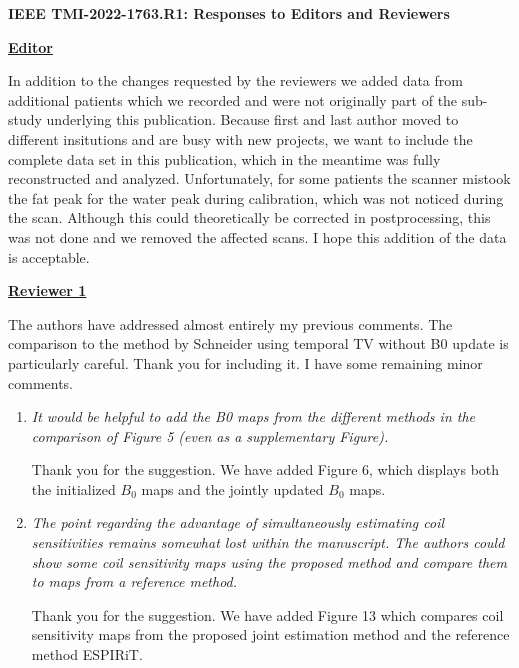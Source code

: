 \documentclass[a4paper,11pt]{report}
\begin{document}
	
\begin{center}
	{\large\textbf{IEEE TMI-2022-1763.R1: Responses to Editors and Reviewers}}
\end{center}


\noindent \underline{\textbf{Editor}}

\noindent In addition to the changes requested by the reviewers we added
data from additional patients which we recorded and were not originally
part of the sub-study underlying this publication. Because first and last
author moved to different insitutions and are busy with new projects, 
we want to include the complete data set in this publication, which in
the meantime was fully reconstructed and analyzed.  Unfortunately, for
some patients the scanner mistook the fat peak for the water
peak during calibration, which was not noticed during the scan.
Although this could theoretically be corrected in postprocessing,
this was not done and we removed the affected scans. I hope this
addition of the data is acceptable.

\vspace{2em}


\noindent \underline{\textbf{Reviewer 1}}

\noindent The authors have addressed almost entirely my previous comments. The comparison to the method by Schneider using temporal TV without B0 update is particularly careful. Thank you for including it. I have some remaining minor comments.

\begin{enumerate}
	\item \textit{It would be helpful to add the B0 maps from the different methods in the comparison of Figure 5 (even as a supplementary Figure).}

\hspace{1em} Thank you for the suggestion. 
We have added Figure 6, 
which displays both the initialized $B_0$ maps and the jointly updated $B_0$ maps.

	\item \textit{The point regarding the advantage of simultaneously estimating coil sensitivities remains somewhat lost within the manuscript. The authors could show some coil sensitivity maps using the proposed method and compare them to  maps from a reference method.}

\hspace{1em} Thank you for the suggestion. 
We have added Figure 13 which compares coil sensitivity maps from 
the proposed joint estimation method and the reference method ESPIRiT.

\end{enumerate}
\end{document}

